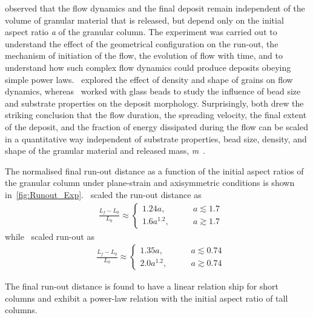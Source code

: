 \citet{Lajeunesse2005} observed that the flow dynamics and the final deposit 
remain independent of the volume of granular material that is released, but 
depend only on the initial aspect ratio \textit{a} of the granular column. 
The experiment was carried out to understand the effect of the geometrical 
configuration on the run-out, the mechanism of initiation of the flow, the 
evolution of flow with time, and to understand how such complex flow dynamics 
could produce deposits obeying simple power laws.~\citet{Lube2005} explored the 
effect of density and shape of grains on flow dynamics, 
whereas~\citet{Lajeunesse2004} worked with glass beads to study the influence 
of bead size and substrate properties on the deposit morphology. Surprisingly, 
both drew the striking conclusion that the flow duration, the spreading 
velocity, the final extent of the deposit, and the fraction of energy 
dissipated during the flow can be scaled in a quantitative way independent of 
substrate properties, bead size, density, and shape of the granular material 
and released mass, \textit{m}~\citep{Lajeunesse2005}.

The normalised final run-out distance as a function of the initial aspect 
ratios of the granular column under plane-strain and axisymmetric conditions 
is shown in~\cref{fig:Runout_Exp}.~\citet{Lube2005} scaled the run-out distance 
as
\begin{align}
& \frac{\textit{L}_{\textit{f}}- 
\textit{L}_{\textit{0}}}{\textit{L}_{\textit{0}}} \approx
\begin{cases} 
1.24\textit{a}, \qquad &\textit{a} \lesssim 1.7 \\
1.6\textit{a}^{1.2}, \qquad &\textit{a} \gtrsim 1.7
\end{cases}
\end{align}
while~\citet{Lajeunesse2005} scaled run-out as
\begin{align}
& \frac{\textit{L}_{\textit{f}}- 
\textit{L}_{\textit{0}}}{\textit{L}_{\textit{0}}} \approx
\begin{cases} 
1.35\textit{a}, \qquad &\textit{a} \lesssim 0.74 \\
2.0\textit{a}^{1.2}, \qquad &\textit{a} \gtrsim 0.74
\end{cases}
\end{align} 

The final run-out distance is found to have a linear relation ship for short 
columns and exhibit a power-law relation with the initial aspect ratio of tall 
columns. 


